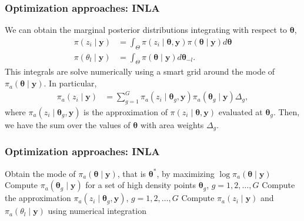 \documentclass[12pt, compress]{beamer}
\begin{document}
\begin{frame}
	\frametitle{Optimization approaches: INLA}
We can obtain the marginal posterior distributions integrating with respect to $\boldsymbol{\theta}$,
\begin{align*}
	\pi(z_i\mid \boldsymbol{y})&=\int_{{\Theta}} \pi(z_i\mid \boldsymbol{\theta},\boldsymbol{y})\pi(\boldsymbol{\theta}\mid\boldsymbol{y})d\boldsymbol{\theta}\\
	\pi(\theta_l\mid\boldsymbol{y})&=\int_{{\Theta}} \pi(\boldsymbol{\theta}\mid \boldsymbol{y})d\boldsymbol{\theta}_{-l}.
\end{align*}
This integrals are solve numerically using a smart grid around the mode of $\pi_a(\boldsymbol{\theta}\mid\boldsymbol{y})$. In particular, 
\begin{align*}
	\pi_a(z_i\mid \boldsymbol{y})&=\sum_{g=1}^G \pi_{a}(z_i\mid \boldsymbol{\theta}_g,\boldsymbol{y})\pi_a(\boldsymbol{\theta}_g\mid \boldsymbol{y})\Delta_g,
\end{align*}
where $\pi_{a}(z_i\mid \boldsymbol{\theta}_g,\boldsymbol{y})$ is the approximation of $\pi(z_i\mid \boldsymbol{\theta},\boldsymbol{y})$ evaluated at $\boldsymbol{\theta}_g$. Then, we have the sum over the values of $\boldsymbol{\theta}$ with area weights $\Delta_g$.
\end{frame}

\begin{frame}
	\frametitle{Optimization approaches: INLA}
\begin{algorithm}[H]
	\caption{Integrated nested Laplace approximations (INLA)}\label{INLA0}
	\begin{algorithmic}[1]
		\State Obtain the mode of $\pi_a(\boldsymbol{\theta}\mid \boldsymbol{y})$, that is $\boldsymbol{\theta}^*$, by maximizing $\log \pi_a(\boldsymbol{\theta}\mid \boldsymbol{y})$
		\State Compute $\pi_a(\boldsymbol{\theta}_g\mid \boldsymbol{y})$ for a set of high density points $\boldsymbol{\theta}_g$, $g=1,2,\dots,G$
		\State Compute the approximation $\pi_a(z_i\mid \boldsymbol{\theta}_g,\boldsymbol{y})$, $g=1,2,\dots,G$
		\State Compute $\pi_a(z_i\mid \boldsymbol{y})$ and $\pi_a(\theta_l\mid\boldsymbol{y})$ using numerical integration     
	\end{algorithmic}
\end{algorithm}
\end{frame}
\end{document}
